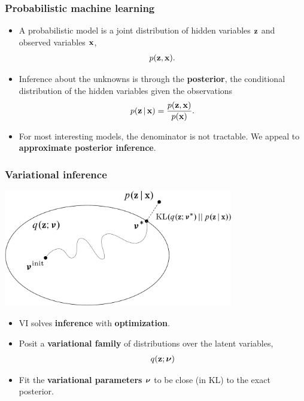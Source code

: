 \documentclass[10pt,
               xcolor={usenames,dvipsnames},
               hyperref={colorlinks,linktoc=all,citecolor=Plum,linkcolor=MidnightBlue,urlcolor=MidnightBlue},noamssymb]{beamer}
\begin{document}
\begin{frame}
\frametitle{Probabilistic machine learning}

\begin{itemize}
\item A probabilistic model is a joint distribution of hidden
  variables $\boldsymbol{\mathbf{z}}$ and observed variables $\boldsymbol{\mathbf{x}}$,
  \begin{align*}
    p(\boldsymbol{\mathbf{z}}, \boldsymbol{\mathbf{x}}).
  \end{align*}
\item Inference about the unknowns is through the \textbf{posterior},
  the conditional distribution of the hidden variables given the observations
  \begin{align*}
    p(\boldsymbol{\mathbf{z}} \,|\, \boldsymbol{\mathbf{x}}) = \frac{p(\boldsymbol{\mathbf{z}}, \boldsymbol{\mathbf{x}})}{p(\boldsymbol{\mathbf{x}})}.
  \end{align*}
\item For most interesting models, the denominator is not tractable.
  We appeal to \textbf{approximate posterior inference}.
\end{itemize}

\end{frame}


\begin{frame}
\frametitle{Variational inference}

\begin{center}
  \includegraphics[width=0.75\textwidth]{img/vi_cartoon.pdf}
\end{center}

\vspace{0.1in}

\begin{itemize}
\item VI solves \textbf{inference} with \textbf{optimization}.
\item Posit a \textbf{variational family} of distributions over the
  latent variables,
  \begin{align*}
    q(\boldsymbol{\mathbf{z}}; \boldsymbol{\mathbf{\nu}})
  \end{align*}
\item Fit the \textbf{variational parameters} $\boldsymbol{\mathbf{\nu}}$ to be close (in
  KL) to the exact posterior.
\end{itemize}
\end{frame}
\end{document}
